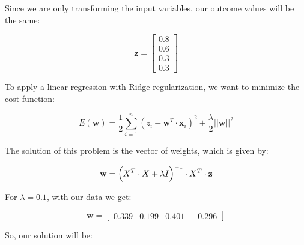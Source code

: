 \documentclass[12pt]{article}
\begin{document}
\begin{enumerate}[leftmargin=\labelsep]
\begin{enumerate}
        Since we are only transforming the input variables, our outcome values will be the same:

        \begin{equation}
            \mathbf{z} = \begin{bmatrix}
                0.8 \\
                0.6 \\
                0.3 \\
                0.3
            \end{bmatrix}
        \end{equation}

        To apply a linear regression with Ridge regularization, we want to minimize the cost function:

        \begin{equation}
            E(\mathbf{w}) = \frac{1}{2}\sum_{i=1}^{n}(z_i - \mathbf{w}^T \cdot \mathbf{x}_i)^2 + \frac{\lambda}{2} ||\mathbf{w}||^2
        \end{equation}

        The solution of this problem is the vector of weights, which is given by:

        \begin{equation}
            \mathbf{w} = \Bigl(  X^T \cdot X + \lambda I\Bigr)^{-1} \cdot X^T \cdot \mathbf{z}
        \end{equation}

        For $\lambda = 0.1$, with our data we get:

        \begin{equation}
            \mathbf{w} = \begin{bmatrix}
                0.339 & 0.199 & 0.401 & -0.296
            \end{bmatrix}
        \end{equation}

        So, our solution will be:


\end{enumerate}
\end{enumerate}
\end{document}
